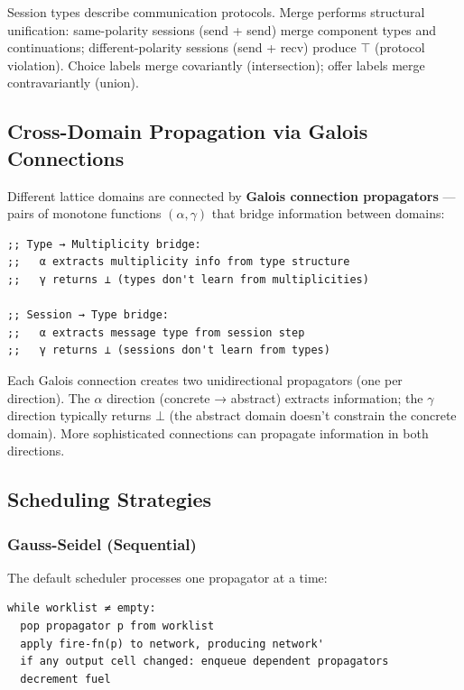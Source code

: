 \documentclass[11pt]{article}
\begin{document}
Session types describe communication protocols. Merge performs structural
unification: same-polarity sessions (send + send) merge component types
and continuations; different-polarity sessions (send + recv) produce
\(\top\) (protocol violation). Choice labels merge covariantly (intersection);
offer labels merge contravariantly (union).
\subsection{Cross-Domain Propagation via Galois Connections}
\label{sec:org31cc2e6}

Different lattice domains are connected by \textbf{Galois connection
propagators} --- pairs of monotone functions \((\alpha, \gamma)\) that
bridge information between domains:

\begin{verbatim}
;; Type → Multiplicity bridge:
;;   α extracts multiplicity info from type structure
;;   γ returns ⊥ (types don't learn from multiplicities)

;; Session → Type bridge:
;;   α extracts message type from session step
;;   γ returns ⊥ (sessions don't learn from types)
\end{verbatim}

Each Galois connection creates two unidirectional propagators (one per
direction). The \(\alpha\) direction (concrete → abstract) extracts
information; the \(\gamma\) direction typically returns \(\bot\) (the
abstract domain doesn't constrain the concrete domain). More
sophisticated connections can propagate information in both directions.
\subsection{Scheduling Strategies}
\label{sec:org2e3aa88}

\subsubsection{Gauss-Seidel (Sequential)}
\label{sec:org4df115a}

The default scheduler processes one propagator at a time:

\begin{verbatim}
while worklist ≠ empty:
  pop propagator p from worklist
  apply fire-fn(p) to network, producing network'
  if any output cell changed: enqueue dependent propagators
  decrement fuel
\end{verbatim}
\end{document}
